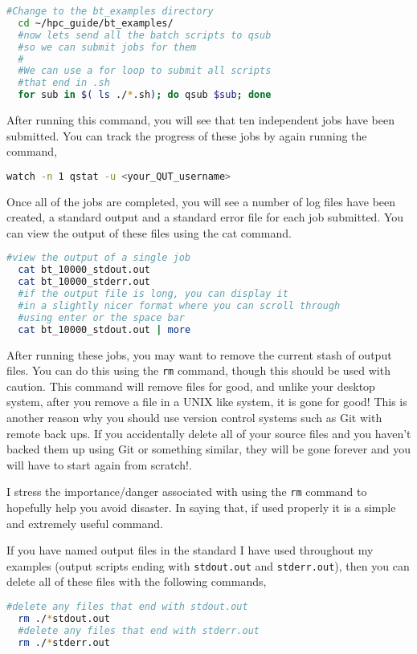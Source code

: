 \begin{lstlisting}[language=bash, frame=single]
  #Change to the bt_examples directory
  cd ~/hpc_guide/bt_examples/
  #now lets send all the batch scripts to qsub
  #so we can submit jobs for them
  #
  #We can use a for loop to submit all scripts
  #that end in .sh
  for sub in $( ls ./*.sh); do qsub $sub; done
\end{lstlisting}
% 
% 
After running this command, you will see that ten independent jobs have been submitted. You can track the progress of these jobs by again running the command,
\begin{lstlisting}[language=bash, frame=single]
  watch -n 1 qstat -u <your_QUT_username>
\end{lstlisting}
%
%
Once all of the jobs are completed, you will see a number of log files have been created, a standard output and a standard error file for each job submitted. You can view the output of these files using the cat command.
%
\begin{lstlisting}[language=bash, frame=single]
  #view the output of a single job
  cat bt_10000_stdout.out
  cat bt_10000_stderr.out
  #if the output file is long, you can display it
  #in a slightly nicer format where you can scroll through
  #using enter or the space bar
  cat bt_10000_stdout.out | more
\end{lstlisting}
%
%
%
After running these jobs, you may want to remove the current stash of output files. You can do this using the \texttt{rm} command, though this should be used with caution. This command will remove files for good, and unlike your desktop system, after you remove a file in a UNIX like system, it is gone for good! This is another reason why you should use version control systems such as Git with remote back ups. If you accidentally delete all of your source files and you haven't backed them up using Git or something similar, they will be gone forever and you will have to start again from scratch!.
%
%
\par
%
%
I stress the importance/danger associated with using the \texttt{rm} command to hopefully help you avoid disaster. In saying that, if used properly it is a simple and extremely useful command.
%
%
\par
If you have named output files in the standard I have used throughout my examples (output scripts ending with \texttt{stdout.out} and \texttt{stderr.out}), then you can delete all of these files with the following commands,
%
\begin{lstlisting}[language=bash, frame=single]
  #delete any files that end with stdout.out
  rm ./*stdout.out
  #delete any files that end with stderr.out
  rm ./*stderr.out
\end{lstlisting}
%
%
%
%
%

